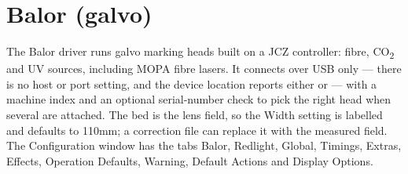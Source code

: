 \section*{Balor (galvo)}

The Balor driver runs galvo marking heads built on a JCZ controller: fibre,
CO\textsubscript{2} and UV sources, including MOPA fibre lasers. It connects
over USB only --- there is no host or port setting, and the device location
reports either  or  --- with a machine index and an
optional serial-number check to pick the right head when several are attached.
The bed is the lens field, so the Width setting is labelled  and
defaults to 110\unit{mm}; a correction file can replace it with the measured
field. The Configuration window has the tabs Balor, Redlight, Global, Timings,
Extras, Effects, Operation Defaults, Warning, Default Actions and Display
Options.

